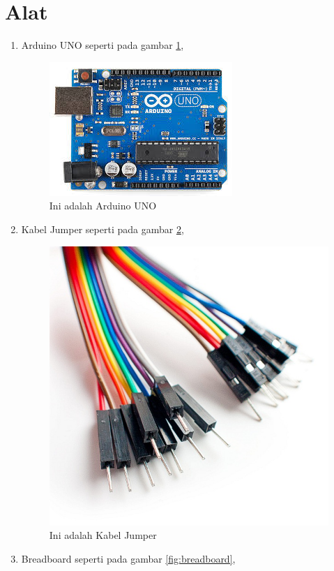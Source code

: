 \section{Alat}
\begin{enumerate}
  \item Arduino UNO seperti pada gambar \ref{fig:arduinouno},
  \begin{figure}[!htbp]
  \centering
  \includegraphics[width=.75\textwidth]{figures/Arduino/arduinouno.jpg}
  \caption{Ini adalah Arduino UNO}\label{fig:arduinouno}
\end{figure}
  \item Kabel Jumper seperti pada gambar \ref{fig:jumper},
  \begin{figure}[!htbp]
  \centering
  \includegraphics[width=.75\textwidth]{figures/Arduino/jumper.jpg}
  \caption{Ini adalah Kabel Jumper}\label{fig:jumper}
\end{figure}
  \item Breadboard seperti pada gambar \ref{fig:breadboard},

\end{enumerate}
